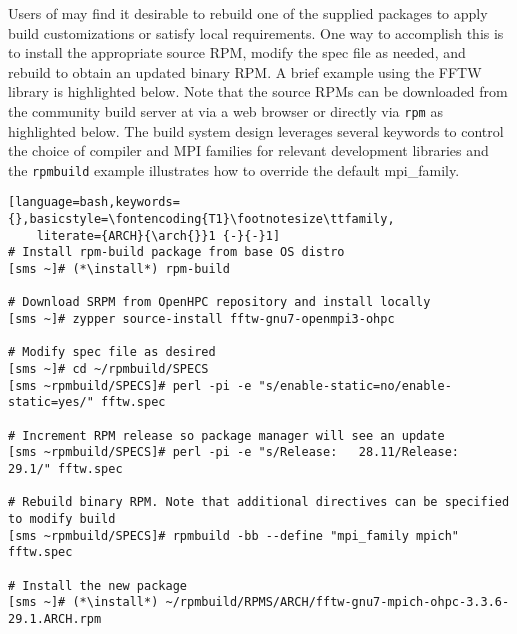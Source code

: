 Users of \OHPC{} may find it desirable to rebuild one of the supplied packages
to apply build customizations or satisfy local requirements. One way to
accomplish this is to install the appropriate source RPM, modify the spec file
as needed, and rebuild to obtain an updated binary RPM. A brief example using
the FFTW library is highlighted below.  Note that the source RPMs can be downloaded from the
community build server at \href{https://build.openhpc.community}
{\color{blue}{https://build.openhpc.community}} via a web browser or directly
via \texttt{rpm} as highlighted below. The \OHPC{} build system design
leverages several keywords to control the choice of compiler and MPI families
for relevant development libraries and the \texttt{rpmbuild} example
illustrates how to override the default mpi\_family.

\begin{lstlisting}[language=bash,keywords={},basicstyle=\fontencoding{T1}\footnotesize\ttfamily,
    literate={ARCH}{\arch{}}1 {-}{-}1]
# Install rpm-build package from base OS distro
[sms ~]# (*\install*) rpm-build

# Download SRPM from OpenHPC repository and install locally
[sms ~]# zypper source-install fftw-gnu7-openmpi3-ohpc

# Modify spec file as desired
[sms ~]# cd ~/rpmbuild/SPECS
[sms ~rpmbuild/SPECS]# perl -pi -e "s/enable-static=no/enable-static=yes/" fftw.spec

# Increment RPM release so package manager will see an update
[sms ~rpmbuild/SPECS]# perl -pi -e "s/Release:   28.11/Release:   29.1/" fftw.spec

# Rebuild binary RPM. Note that additional directives can be specified to modify build
[sms ~rpmbuild/SPECS]# rpmbuild -bb --define "mpi_family mpich" fftw.spec

# Install the new package
[sms ~]# (*\install*) ~/rpmbuild/RPMS/ARCH/fftw-gnu7-mpich-ohpc-3.3.6-29.1.ARCH.rpm
\end{lstlisting}
